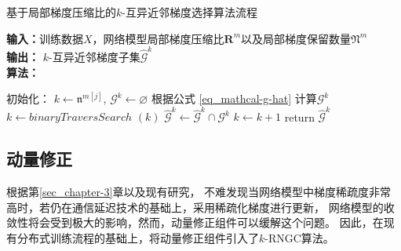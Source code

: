 \documentclass{xdupgthesis}
\begin{document}
\renewcommand{\arraystretch}{1.3}
\begin{algorithm}[ht]
    \caption{基于局部梯度压缩比的$k$-互异近邻梯度选择算法流程}
    \label{alg_k-RNGC-knn}
    \raggedright
    \hspace*{0.02in} \textbf{输入：}训练数据$X$，网络模型局部梯度压缩比$\mathbf{R}^{m}$以及局部梯度保留数量$\mathfrak{N}^{m}$ \\
    \hspace*{0.02in} \textbf{输出：} $k$-互异近邻梯度子集$\hat{\mathcal{G}}^{k}$ \\
    \hspace*{0.02in} \textbf{算法：} \\
    \begin{algorithmic}[1]
            \State 初始化： $k \leftarrow \mathfrak{n}^{m[j]}$, $\mathcal{G}^{k} \leftarrow \varnothing$ 
                \State 根据公式 \eqref{eq_mathcal-g-hat} 计算$\mathcal{G}^{k}$
                \State $k \leftarrow  binaryTraversSearch$ \cite{cormen2022introduction} $(k)$
                \State $\hat{\mathcal{G}}^{k} \leftarrow \hat{\mathcal{G}}^{k} \cap \mathcal{G}^{k}$
                \State $k \leftarrow k + 1$
            \EndWhile
        \EndFor
        \State return $\hat{\mathcal{G}}^{k}$
    \end{algorithmic}
\end{algorithm}

\subsection{动量修正}
根据第\ref{sec_chapter-3}章以及现有研究\cite{chen2018adacomp}，
不难发现当网络模型中梯度稀疏度非常高时，若仍在通信延迟技术的基础上，采用稀疏化梯度进行更新，
网络模型的收敛性将会受到极大的影响，然而，动量修正组件可以缓解这个问题。
因此，在现有分布式训练流程的基础上，将动量修正组件引入了$k$-RNGC算法。
\end{document}
